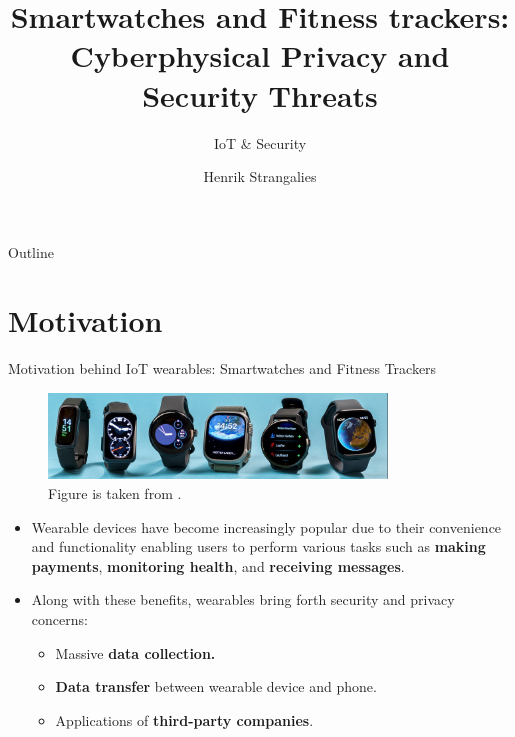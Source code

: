 \documentclass[ucs,9pt,usenames,dvipsnames]{beamer}
\title[Privacy \& Security Threats of IoT Wearables] %
{Smartwatches and Fitness trackers: Cyberphysical Privacy and Security Threats}
\subtitle
{IoT \& Security}
\author[Author, Another] %
{Henrik Strangalies} %
\institute[Computer Science] %
{Freie Universität Berlin}
\begin{document}
\begin{frame}[plain]
  \titlepage
\end{frame}

\begin{frame}{Outline}
  \tableofcontents
\end{frame}

\section{Motivation}



\begin{frame}{Motivation behind IoT wearables: Smartwatches and Fitness Trackers}
  
  \vspace{0.3cm}
  \begin{figure}
  	\centering
  	\includegraphics[width=9cm]{imgs/smartwatches}
  	\caption{Figure is taken from \cite{smartwatches}.}
  \end{figure}
  
  \begin{itemize}
  \item Wearable devices have become increasingly popular due to their convenience and functionality enabling users to perform various tasks such as \textbf{making payments}, \textbf{monitoring health}, and \textbf{receiving messages}.
 
  
  \pause 
  
  \item  Along with these benefits, wearables bring forth security and privacy concerns:
  \begin{itemize}
	\item Massive \textbf{data collection.}
	\item \textbf{Data transfer} between wearable device and phone.
	\item Applications of \textbf{third-party companies}.
  \end{itemize}
  \end{itemize}
\end{frame}
\end{document}
